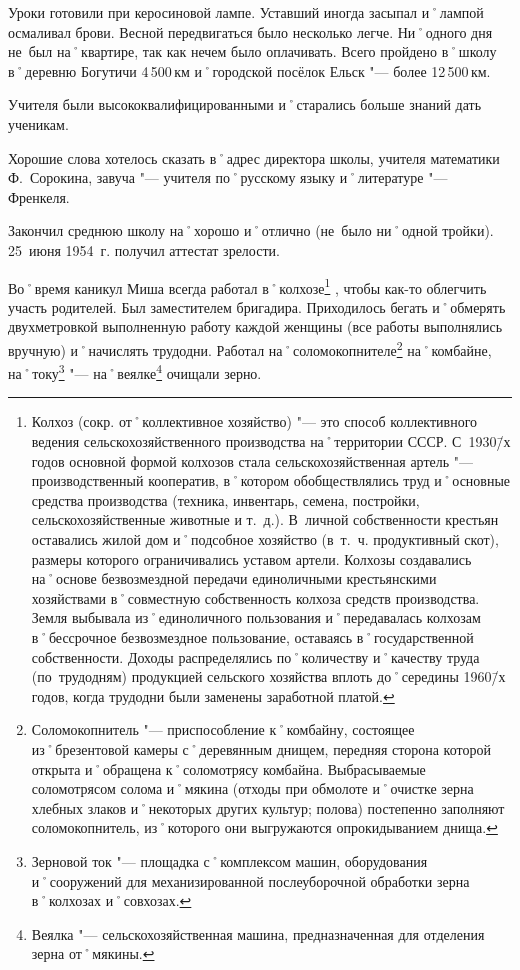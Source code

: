 Уроки готовили при керосиновой лампе. Уставший иногда засыпал и˚лампой осмаливал брови. Весной передвигаться было несколько легче. Ни˚одного дня не~был на˚квартире, так как нечем было оплачивать. Всего пройдено в˚школу в˚деревню Богутичи 4\,500\,км и˚городской посёлок Ельск "--- более 12\,500\,км. 

Учителя были высококвалифицированными и˚старались больше знаний дать ученикам.

Хорошие слова хотелось сказать в˚адрес директора школы, учителя математики Ф.~Сорокина, завуча "--- учителя по˚русскому языку и˚литературе "--- Френкеля. 

Закончил среднюю школу на˚хорошо и˚отлично (не~было ни˚одной тройки). 25~июня 1954~г. получил аттестат зрелости.

Во˚время каникул Миша всегда работал в˚колхозе\footnote
{Колхоз (сокр. от˚коллективное хозяйство) "--- это способ коллективного ведения сельскохозяйственного производства на˚территории СССР. С~1930\=/х годов основной формой колхозов стала сельскохозяйственная артель "--- производственный кооператив, в˚котором обобществлялись труд и˚основные средства производства (техника, инвентарь, семена, постройки, сельскохозяйственные животные и т.~д.). В~личной собственности крестьян оставались жилой дом и˚подсобное хозяйство (в~т.~ч. продуктивный скот), размеры которого ограничивались уставом артели. Колхозы создавались на˚основе безвозмездной передачи единоличными крестьянскими хозяйствами в˚совместную собственность колхоза средств производства. Земля выбывала из˚единоличного пользования и˚передавалась колхозам в˚бессрочное безвозмездное пользование, оставаясь в˚государственной собственности. Доходы распределялись по˚количеству и˚качеству труда (по~трудодням) продукцией сельского хозяйства вплоть до˚середины 1960\=/х годов, когда трудодни были заменены заработной платой.}%
, чтобы как-то облегчить участь родителей. Был заместителем бригадира. Приходилось бегать и˚обмерять двухметровкой выполненную работу каждой женщины (все работы выполнялись вручную) и˚начислять трудодни. Работал на˚соломокопнителе\footnote
{Соломокопнитель "--- приспособление к˚комбайну, состоящее из˚брезентовой камеры с˚деревянным днищем, передняя сторона которой открыта и˚обращена к˚соломотрясу комбайна. Выбрасываемые соломотрясом солома и˚мякина (отходы при обмолоте и˚очистке зерна хлебных злаков и˚некоторых других культур; полова) постепенно заполняют соломокопнитель, из˚которого они выгружаются опрокидыванием днища.}
на˚комбайне, на˚току\footnote
{Зерновой ток "--- площадка с˚комплексом машин, оборудования и˚сооружений для механизированной послеуборочной обработки зерна в˚колхозах и˚совхозах.}
"--- на˚веялке\footnote
{Веялка "--- сельскохозяйственная машина, предназначенная для отделения зерна от˚мякины.} очищали зерно.

